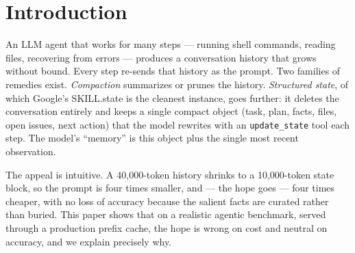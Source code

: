 \documentclass[11pt]{article}
\begin{document}
\section{Introduction}
An LLM agent that works for many steps --- running shell commands, reading files,
recovering from errors --- produces a conversation history that grows without
bound. Every step re-sends that history as the prompt. Two families of remedies
exist. \emph{Compaction} summarizes or prunes the history. \emph{Structured
state}, of which Google's SKILL.state is the cleanest instance, goes further: it
deletes the conversation entirely and keeps a single compact object (task, plan,
facts, files, open issues, next action) that the model rewrites with an
\texttt{update\_state} tool each step. The model's ``memory'' is this object plus
the single most recent observation.

The appeal is intuitive. A 40{,}000-token history shrinks to a 10{,}000-token
state block, so the prompt is four times smaller, and --- the hope goes --- four
times cheaper, with no loss of accuracy because the salient facts are curated
rather than buried. This paper shows that on a realistic agentic benchmark,
served through a production prefix cache, the hope is wrong on cost and neutral
on accuracy, and we explain precisely why.
\end{document}
